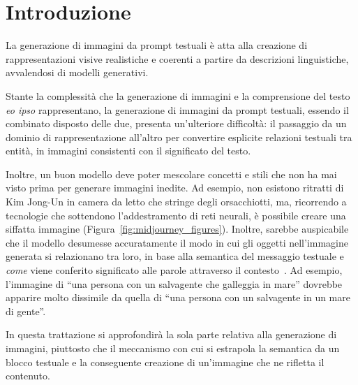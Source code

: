 \chapter{Introduzione}



La generazione di immagini da prompt testuali è atta alla creazione di rappresentazioni visive realistiche e coerenti a partire da descrizioni linguistiche, 
avvalendosi di modelli generativi.

Stante la complessità che la generazione di immagini e la comprensione del testo \emph{eo ipso} rappresentano, 
la generazione di immagini da prompt testuali, essendo il combinato disposto delle due, presenta un'ulteriore difficoltà: 
il passaggio da un dominio di rappresentazione all'altro per convertire esplicite relazioni testuali tra entità, in immagini consistenti con il significato del testo. 

Inoltre, un buon modello deve poter mescolare concetti e stili che non ha mai visto prima per generare immagini inedite.
Ad esempio, non esistono ritratti di Kim Jong-Un in camera da letto che stringe degli orsacchiotti, 
ma, ricorrendo a tecnologie che sottendono l'addestramento di reti neurali, è possibile creare una siffatta immagine (Figura~\ref{fig:midjourney_figures}).
Inoltre, sarebbe auspicabile che il modello desumesse accuratamente il modo in cui gli oggetti nell'immagine generata si relazionano tra loro, 
in base alla semantica del messaggio testuale e \emph{come} viene conferito significato alle parole attraverso il contesto~\cite{fosterGenerativeDeepLearning2023}.
Ad esempio, l'immagine di “una persona con un salvagente che galleggia in mare” dovrebbe apparire molto dissimile da quella di 
“una persona con un salvagente in un mare di gente”. 

\smallskip
\noindent In questa trattazione si approfondirà la sola parte relativa alla generazione di immagini, piuttosto che il meccanismo 
con cui si estrapola la semantica da un blocco testuale e la conseguente creazione di un'immagine che ne rifletta il contenuto.


